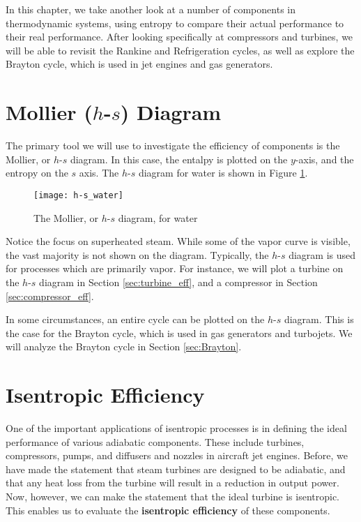 In this chapter, we take another look at a number of components in thermodynamic systems, using entropy to compare their actual performance to their real performance.  After looking specifically at compressors and turbines, we will be able to revisit the Rankine and Refrigeration cycles, as well as explore the Brayton cycle, which is used in jet engines and gas generators.

\section{Mollier ($h$-$s$) Diagram}
The primary tool we will use to investigate the efficiency of components is the Mollier, or $h$-$s$ diagram.  In this case, the entalpy is plotted on the $y$-axis, and the entropy on the $s$ axis.  The $h$-$s$ diagram for water is shown in Figure \ref{fig:hs_water}.

\begin{figure}[H]
  \centering
  \texttt{[image: h-s\_water]}
  \caption{The Mollier, or $h$-$s$ diagram, for water}
  \label{fig:hs_water}
\end{figure}

Notice the focus on superheated steam.  While some of the vapor curve is visible, the vast majority is not shown on the diagram.  Typically, the $h$-$s$ diagram is used for processes which are primarily vapor.  For instance, we will plot a turbine on the $h$-$s$ diagram in Section \ref{sec:turbine_eff}, and a compressor in Section \ref{sec:compressor_eff}.

In some circumstances, an entire cycle can be plotted on the $h$-$s$ diagram.  This is the case for the Brayton cycle, which is used in gas generators and turbojets.  We will analyze the Brayton cycle in Section \ref{sec:Brayton}.

\section{Isentropic Efficiency}

One of the important applications of isentropic processes is in defining the ideal performance of various adiabatic components. These include turbines, compressors, pumps, and diffusers and nozzles in aircraft jet engines. Before, we have made the statement that steam turbines are designed to be adiabatic, and that any heat loss from the turbine will result in a reduction in output power. Now, however, we can make the statement that the ideal turbine is isentropic. This enables us to evaluate the {\bf isentropic efficiency} of these components.

